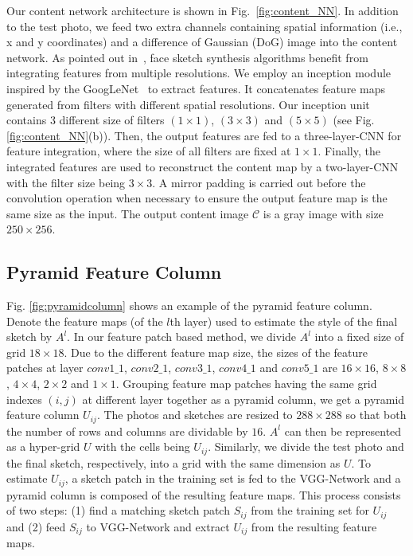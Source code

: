 \documentclass[10pt,twocolumn,letterpaper]{article}
\begin{document}
Our content network architecture is shown in Fig.~\ref{fig:content_NN}. In addition to the test photo, we feed two extra channels containing spatial information (i.e., x and y coordinates) and a difference of Gaussian (DoG) image into the content network. As pointed out in~\cite{wang2009face}, face sketch synthesis algorithms benefit from integrating features from multiple resolutions. We employ an inception module inspired by the GoogLeNet~\cite{szegedy2015going} to extract features. It concatenates feature maps generated from filters with different spatial resolutions. Our inception unit contains 3 different size of filters $(1\times1)$, $(3\times3)$ and $(5\times5)$ (see Fig. \ref{fig:content_NN}(b)). Then, the output features are fed to a three-layer-CNN for feature integration, where the size of all filters are fixed at $1\times1$. Finally, the integrated features are used to reconstruct the content map by a two-layer-CNN with the filter size being $3\times3$. A mirror padding is carried out before the convolution operation when necessary to ensure the output feature map is the same size as the input. The output content image $\mathcal{C}$ is a gray image with size $250\times256$.

\subsection{Pyramid Feature Column}

Fig. \ref{fig:pyramidcolumn} shows an example of the pyramid feature column. Denote the feature maps (of the $l$th layer) used to estimate the style of the final sketch by $A^{l}$. In our feature patch based method, we divide $A^{l}$ into a fixed size of grid $18\times18$. Due to the different feature map size, the sizes of the feature patches at layer $conv1\_1$, $conv2\_1$, $conv3\_1$, $conv4\_1$ and $conv5\_1$ are $16\times16$, $8\times8$, $4\times4$, $2\times2$ and $1\times1$. Grouping feature map patches having the same grid indexes $(i, j)$ at different layer together as a pyramid column, we get a pyramid feature column $U_{ij}$. The photos and sketches are resized to $288\times288$ so that both the number of rows and columns are dividable by $16$. $A^{l}$ can then be represented as a hyper-grid $U$ with the cells being $U_{ij}$. Similarly, we divide the test photo and the final sketch, respectively, into a grid with the same dimension as $U$. To estimate $U_{ij}$, a sketch patch in the training set is fed to the VGG-Network and a pyramid column is composed of the resulting feature maps. This process consists of two steps: (1) find a matching sketch patch $S_{ij}$ from the training set for $U_{ij}$ and (2) feed $S_{ij}$ to VGG-Network and extract $U_{ij}$ from the resulting feature maps.
\end{document}
